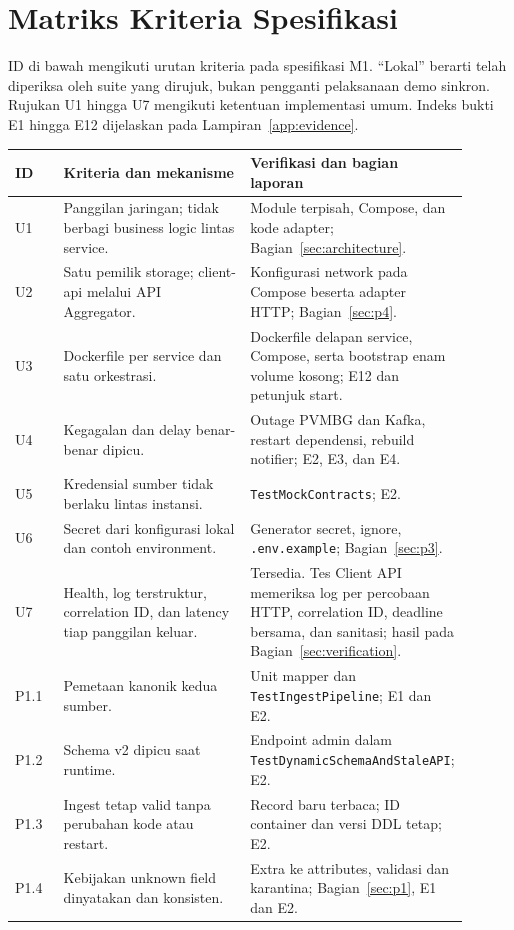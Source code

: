 \section{Matriks Kriteria Spesifikasi}
\label{app:matrix}
ID di bawah mengikuti urutan kriteria pada spesifikasi M1. ``Lokal'' berarti telah diperiksa oleh suite yang dirujuk, bukan pengganti pelaksanaan demo sinkron. Rujukan U1 hingga U7 mengikuti ketentuan implementasi umum. Indeks bukti E1 hingga E12 dijelaskan pada Lampiran~\ref{app:evidence}.

\small
\begin{longtable}{P{0.11\linewidth}P{0.45\linewidth}P{0.34\linewidth}}
\toprule ID & Kriteria dan mekanisme & Verifikasi dan bagian laporan\\\midrule\endhead
U1 & Panggilan jaringan; tidak berbagi business logic lintas service. & Module terpisah, Compose, dan kode adapter; Bagian~\ref{sec:architecture}.\\
U2 & Satu pemilik storage; client-api melalui API Aggregator. & Konfigurasi network pada Compose beserta adapter HTTP; Bagian~\ref{sec:p4}.\\
U3 & Dockerfile per service dan satu orkestrasi. & Dockerfile delapan service, Compose, serta bootstrap enam volume kosong; E12 dan petunjuk start.\\
U4 & Kegagalan dan delay benar-benar dipicu. & Outage PVMBG dan Kafka, restart dependensi, rebuild notifier; E2, E3, dan E4.\\
U5 & Kredensial sumber tidak berlaku lintas instansi. & \texttt{TestMockContracts}; E2.\\
U6 & Secret dari konfigurasi lokal dan contoh environment. & Generator secret, ignore, \texttt{.env.example}; Bagian~\ref{sec:p3}.\\
U7 & Health, log terstruktur, correlation ID, dan latency tiap panggilan keluar. & Tersedia. Tes Client API memeriksa log per percobaan HTTP, correlation ID, deadline bersama, dan sanitasi; hasil pada Bagian~\ref{sec:verification}.\\
\midrule
P1.1 & Pemetaan kanonik kedua sumber. & Unit mapper dan \texttt{TestIngestPipeline}; E1 dan E2.\\
P1.2 & Schema v2 dipicu saat runtime. & Endpoint admin dalam \texttt{TestDynamicSchemaAndStaleAPI}; E2.\\
P1.3 & Ingest tetap valid tanpa perubahan kode atau restart. & Record baru terbaca; ID container dan versi DDL tetap; E2.\\
P1.4 & Kebijakan unknown field dinyatakan dan konsisten. & Extra ke attributes, validasi dan karantina; Bagian~\ref{sec:p1}, E1 dan E2.\\

\end{longtable}
